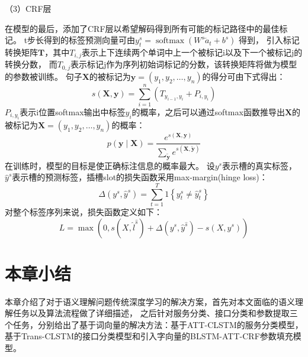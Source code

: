 （3）CRF层

在模型的最后，添加了CRF层以希望解码得到所有可能的标记路径中的最佳标记。 
t步长得到的标签预测向量可由$y_{t}^{s}=\operatorname{softmax}\left(W^{s} \overleftarrow{a}_{t}+b^{s}\right)$
得到，
引入标记转换矩阵$\mathbf{T}$，其中$T_{i,j}$表示上下连续两个单词中上一个被标记i以及下一个被标记j的转换分数，
而$T_{0,j}$表示标记j作为序列初始词标记的分数，该转换矩阵将做为模型的参数被训练。 
句子$\mathbf{X}$的被标记为$\mathbf{y}=(y_1,y_2,\dots,y_n)$的得分可由下式得出：
\begin{equation}
  s(\mathbf{X}, \mathbf{y})=\sum_{i=1}^{n}\left(T_{y_{i-1}, y_{i}}+P_{i, y_{i}}\right)
\end{equation}
$P_{i, y_{i}}$表示i位置softmax输出中标签$y_{i}$的概率，之后可以通过softmax函数推导出$\mathbf{X}$的被标记为$\mathbf{X}=(y_1,y_2,\dots,y_n)$的概率：
\begin{equation}
  p(\mathbf{y} \mid \mathbf{X})=\frac{e^{s(\mathbf{X}, \mathbf{y})}}{\sum_{\tilde{\mathbf{y}}} e^{s(\mathbf{X}, \tilde{\mathbf{y}})}}
\end{equation}
在训练时，模型的目标是使正确标注信息的概率最大。
设$y^{s}$表示槽的真实标签，$\hat y^{s}$表示槽的预测标签，插槽slot的损失函数采用max-margin(hinge loss)：
\begin{equation}
\Delta\left(y^{s}, \hat{y}^{s}\right)=\sum_{t=1}^{T} 1\left\{y_{t}^{s} \neq \hat{y}_{t}^{s}\right\}
\end{equation}
对整个标签序列来说，损失函数定义如下：
\begin{equation}
L=\max (0, s(X,\hat{l}^{\hat{s}})+\Delta(y^{s}, \hat{y}^{\hat{s}})-s(X,y^{s}))
\end{equation}






\section{本章小结}
本章介绍了对于语义理解问题传统深度学习的解决方案，首先对本文面临的语义理解任务以及算法流程做了详细描述，
之后针对服务分类、接口分类和参数提取三个任务，分别给出了基于词向量的解决方法：基于ATT-CLSTM的服务分类模型，
基于Trans-CLSTM的接口分类模型和引入字向量的BLSTM-ATT-CRF参数填充模型。